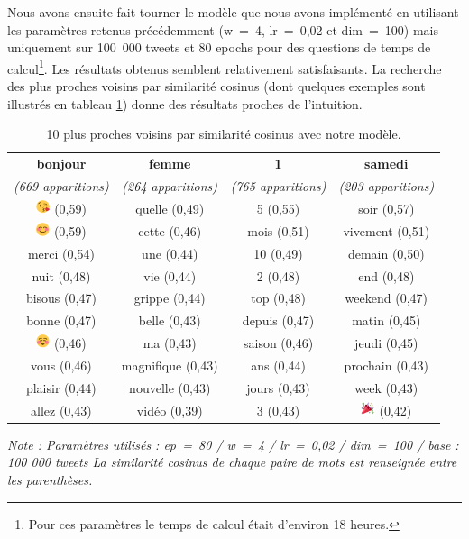 \documentclass[11pt,french,french]{article}
\let\rmarkdownfootnote\footnote%
\def\footnote{\protect\rmarkdownfootnote}
\begin{document}
Nous avons ensuite fait tourner le modèle que nous avons implémenté en
utilisant les paramètres retenus précédemment (w~=~4, lr~=~0,02 et
dim~=~100) mais uniquement sur 100~000 tweets et 80 epochs pour des
questions de temps de calcul\footnote{Pour ces paramètres le temps de
  calcul était d'environ 18 heures.}. Les résultats obtenus semblent
relativement satisfaisants. La recherche des plus proches voisins par
similarité cosinus (dont quelques exemples sont illustrés en tableau
\ref{table:knn_ark}) donne des résultats proches de l'intuition.

\begin{table}[!h]
\begin{center}
\begin{tabular}{|c|c|c|c|}
    \hline
\textbf{bonjour} & \textbf{femme} & \textbf{1} & \textbf{samedi} \tabularnewline
\emph{(669 apparitions)} & \emph{(264 apparitions)} & \emph{(765 apparitions)} & \emph{(203 apparitions)} \tabularnewline
       \hline
\includegraphics[height=4mm]{img/emojis/1.png} (0,59) & quelle (0,49) & 5 (0,55) & soir (0,57) \tabularnewline
\includegraphics[height=4mm]{img/emojis/2.png} (0,59) & cette (0,46) & mois (0,51) & vivement (0,51) \tabularnewline
merci (0,54) & une (0,44) & 10 (0,49) & demain (0,50) \tabularnewline
nuit (0,48) & vie (0,44) & 2 (0,48) & end (0,48) \tabularnewline
bisous (0,47) & grippe (0,44) & top (0,48) & weekend (0,47) \tabularnewline
bonne (0,47) & belle (0,43) & depuis (0,47) & matin (0,45) \tabularnewline
\includegraphics[height=4mm]{img/emojis/3.png} (0,46) & ma (0,43) & saison (0,46) & jeudi (0,45) \tabularnewline
vous (0,46) & magnifique (0,43) & ans (0,44) & prochain (0,43) \tabularnewline
plaisir (0,44) & nouvelle (0,43) & jours (0,43) & week (0,43) \tabularnewline
allez (0,43) & vidéo (0,39) & 3 (0,43) & \includegraphics[height=4mm]{img/emojis/4.png} (0,42) \tabularnewline
    \hline
 \end{tabular}
\captionsetup{margin=0cm,format=hang,justification=justified}
\caption{10 plus proches voisins par similarité cosinus avec \og notre \fg{} modèle.}\label{table:knn_ark}
\end{center}
\vspace{-0.3cm}
\footnotesize
\emph{Note : Paramètres utilisés : ep = 80 / w = 4 / lr = 0,02 / dim = 100 / base : 100 000 tweets\newline
La similarité cosinus de chaque paire de mots est renseignée entre les parenthèses.}

\end{table}
\end{document}
